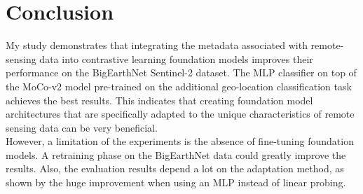 \section{Conclusion}

My study demonstrates that integrating the metadata associated with remote-sensing data into contrastive learning foundation models improves their performance on the BigEarthNet Sentinel-2 dataset. The MLP classifier on top of the MoCo-v2 model pre-trained on the additional geo-location classification task achieves the best results. This indicates that creating foundation model architectures that are specifically adapted to the unique characteristics of remote sensing data can be very beneficial. \\ 
However, a limitation of the experiments is the absence of fine-tuning foundation models. A retraining phase on the BigEarthNet data could greatly improve the results. Also, the evaluation results depend a lot on the adaptation method, as shown by the huge improvement when using an MLP instead of linear probing.
